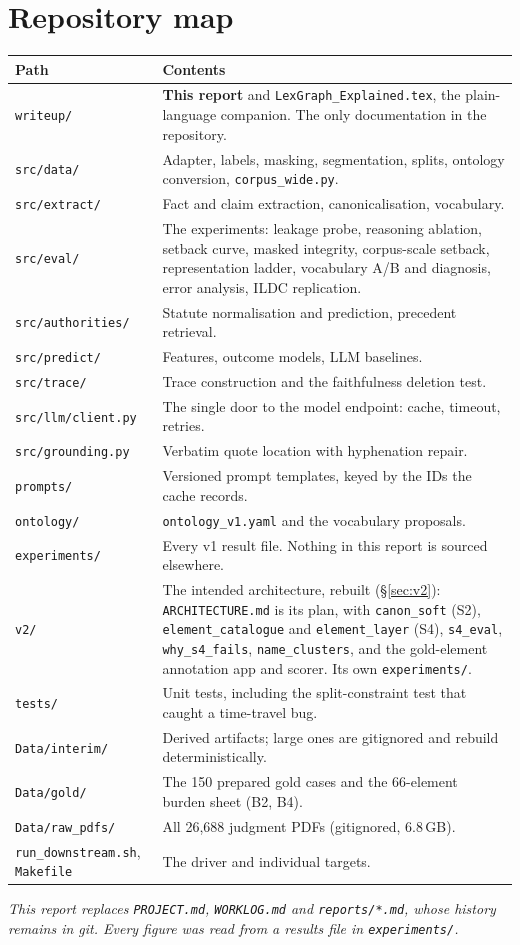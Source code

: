\documentclass[12pt,a4paper]{article}
\newcommand{\code}[1]{\texttt{\small #1}}
\begin{document}
\section{Repository map}

\begin{center}
{\small
\begin{tabular}{@{}lp{9.6cm}@{}}
\toprule
\textbf{Path} & \textbf{Contents} \\
\midrule
\code{writeup/} & \textbf{This report} and \code{LexGraph\_Explained.tex}, the plain-language
  companion. The only documentation in the repository. \\
\code{src/data/} & Adapter, labels, masking, segmentation, splits, ontology conversion,
  \code{corpus\_wide.py}. \\
\code{src/extract/} & Fact and claim extraction, canonicalisation, vocabulary. \\
\code{src/eval/} & The experiments: leakage probe, reasoning ablation, setback curve, masked
  integrity, corpus-scale setback, representation ladder, vocabulary A/B and diagnosis, error
  analysis, ILDC replication. \\
\code{src/authorities/} & Statute normalisation and prediction, precedent retrieval. \\
\code{src/predict/} & Features, outcome models, LLM baselines. \\
\code{src/trace/} & Trace construction and the faithfulness deletion test. \\
\code{src/llm/client.py} & The single door to the model endpoint: cache, timeout, retries. \\
\code{src/grounding.py} & Verbatim quote location with hyphenation repair. \\
\code{prompts/} & Versioned prompt templates, keyed by the IDs the cache records. \\
\code{ontology/} & \code{ontology\_v1.yaml} and the vocabulary proposals. \\
\code{experiments/} & Every v1 result file. Nothing in this report is sourced elsewhere. \\
\code{v2/} & The intended architecture, rebuilt (§\ref{sec:v2}): \code{ARCHITECTURE.md} is its plan,
  with \code{canon\_soft} (S2), \code{element\_catalogue} and \code{element\_layer} (S4),
  \code{s4\_eval}, \code{why\_s4\_fails}, \code{name\_clusters}, and the gold-element annotation
  app and scorer. Its own \code{experiments/}. \\
\code{tests/} & Unit tests, including the split-constraint test that caught a time-travel bug. \\
\code{Data/interim/} & Derived artifacts; large ones are gitignored and rebuild deterministically. \\
\code{Data/gold/} & The 150 prepared gold cases and the 66-element burden sheet (B2, B4). \\
\code{Data/raw\_pdfs/} & All 26,688 judgment PDFs (gitignored, 6.8\,GB). \\
\code{run\_downstream.sh}, \code{Makefile} & The driver and individual targets. \\
\bottomrule
\end{tabular}}
\end{center}

\vfill
\begin{center}
\small\emph{This report replaces \code{PROJECT.md}, \code{WORKLOG.md} and \code{reports/*.md}, whose
history remains in git. Every figure was read from a results file in \code{experiments/}.}
\end{center}
\end{document}
